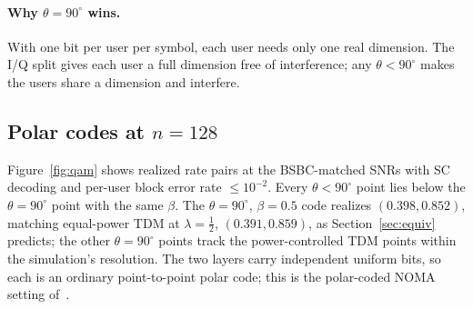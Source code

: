 \documentclass[11pt]{article}
\begin{document}
\begin{table}[t]
\centering
\caption{Largest $R_1$ advantage (bits/symbol) of the best 4-point SUP constellation over TDM. ``Finite $n$'' is the range over $n=2^7,\dots,2^{12}$. The optimum is $\theta=90^\circ$ in every case.}
\label{tab:qam}
\end{table}

\paragraph{Why $\theta=90^\circ$ wins.} With one bit per user per symbol, each user needs only one real dimension. The I/Q split gives each user a full dimension free of interference; any $\theta<90^\circ$ makes the users share a dimension and interfere.

\subsection{Polar codes at $n=128$}
Figure~\ref{fig:qam} shows realized rate pairs at the BSBC-matched SNRs with SC decoding and per-user block error rate $\le10^{-2}$. Every $\theta<90^\circ$ point lies below the $\theta=90^\circ$ point with the same $\beta$. The $\theta=90^\circ$, $\beta=0.5$ code realizes $(0.398, 0.852)$, matching equal-power TDM at $\lambda=\frac12$, $(0.391, 0.859)$, as Section~\ref{sec:equiv} predicts; the other $\theta=90^\circ$ points track the power-controlled TDM points within the simulation's resolution. The two layers carry independent uniform bits, so each is an ordinary point-to-point polar code; this is the polar-coded NOMA setting of~\cite{dai2018pcnoma}.
\end{document}
